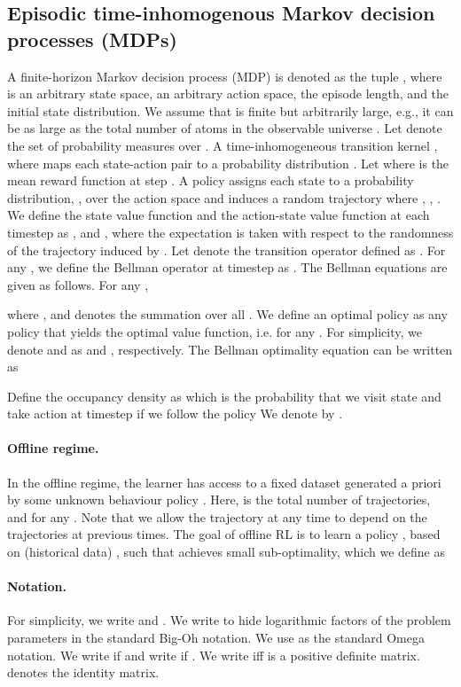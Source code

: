 \documentclass{article} \usepackage{iclr2023/iclr2023_conference,times}
\begin{document}
\subsection{Episodic time-inhomogenous Markov decision processes (MDPs)}
A finite-horizon Markov decision process (MDP) is denoted as the tuple , where  is an arbitrary state space,  an arbitrary action space,  the episode length, and  the initial state distribution. We assume that  is finite but arbitrarily large, e.g.,  it can be as large as the total number of atoms in the observable universe . Let  denote the set of probability measures over . A time-inhomogeneous transition kernel , where  maps each state-action pair  to a probability distribution . Let  where  is the mean reward function at step . A policy  assigns each state  to a probability distribution, , over the action space  and induces a random trajectory  where , , . We define the state value function  and the action-state value function  at each timestep  as 
, and ,
where the expectation  is taken with respect to the randomness of the trajectory induced by . Let  denote the transition operator defined as . For any , we define the Bellman operator at timestep  as . The Bellman equations are given as follows. For any ,

where , and  denotes the summation over all . 
We define an optimal policy  as any policy that yields the optimal value function, i.e.  for any . For simplicity, we denote  and  as  and , respectively. The Bellman optimality equation can be written as

Define the occupancy density as   which is the probability that we visit state  and take action  at timestep  if we follow the policy   
We denote  by . 

\paragraph{Offline regime.} In the offline regime, the learner has access to a fixed dataset  generated a priori by some unknown behaviour policy . Here,  is the total number of trajectories, and  for any . Note that we allow the trajectory at any time  to depend on the trajectories at previous times. The goal of offline RL is to learn a policy , based on (historical data) ,
such that  achieves small sub-optimality, which we define as




\paragraph{Notation.} For simplicity, we write  and . We write  to hide logarithmic factors of the problem parameters  in the standard Big-Oh notation. We use  as the standard Omega notation. We write  if  and write  if . We write  iff  is a positive definite matrix.   denotes the  identity matrix. 
\end{document}
